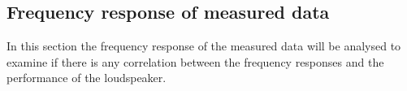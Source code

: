 \subsection{Frequency response of measured data}

In this section the frequency response of the measured data will be analysed to examine if there is any correlation between the frequency responses and the performance of the loudspeaker.